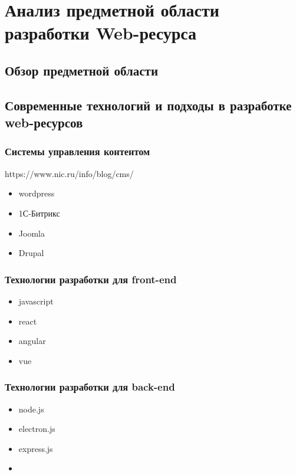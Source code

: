 \section{Анализ предметной области разработки Web-ресурса}
\subsection{Обзор предметной области}                                                           %

\subsection{Современные технологий и подходы в разработке web-ресурсов}                         %
    \subsubsection{Системы управления контентом}                                                %
        https://www.nic.ru/info/blog/cms/
        \begin{itemize}
            \item wordpress
            \item 1С-Битрикс
            \item Joomla
            \item Drupal
        \end{itemize}

    \subsubsection{Технологии разработки для front-end}                                         %
        \begin{itemize}
            \item javascript
            \item react
            \item angular
            \item vue
        \end{itemize}

    \subsubsection{Технологии разработки для back-end}                                          %
        \begin{itemize}
            \item node.js
            \item electron.js
            \item express.js
            \item 
        \end{itemize}

